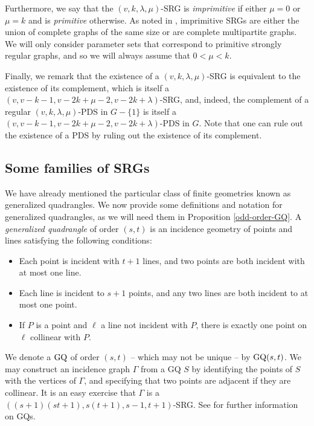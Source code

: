 \documentclass[12pt]{amsproc} %
\theoremstyle{definition}\newtheorem{defn}[thm]{Definition}
\theoremstyle{definition}\newtheorem{rem}[thm]{Remark}
\theoremstyle{definition}\newtheorem{ex}[thm]{Example}
\newcommand{\GQ}{{\rm GQ}}
\begin{document}
Furthermore, we say that the $(v, k, \lambda, \mu)$-SRG is \textit{imprimitive} if either $\mu = 0$ or $\mu = k$ and is \textit{primitive} otherwise. As noted in \cite[Section 1.1.3]{brouwer-maldeghem}, imprimitive SRGs are either the union of complete graphs of the same size or are complete multipartite graphs. We will only consider parameter sets that correspond to primitive strongly regular graphs, and so we will always assume that $0 < \mu < k$.

Finally, we remark that the existence of a $(v,k,\lambda, \mu)$-SRG is equivalent to the existence of its complement, which is itself a $(v, v - k - 1, v - 2k +\mu - 2, v - 2k + \lambda)$-SRG, and, indeed, the complement of a regular $(v, k, \lambda, \mu)$-PDS in $G - \{1\}$ is itself a $(v, v - k - 1, v - 2k +\mu - 2, v - 2k + \lambda)$-PDS in $G$. Note that one can rule out the existence of a PDS by ruling out the existence of its complement. 

\subsection{Some families of SRGs}
\label{subsec:famSRG}
We have already mentioned the particular class of finite geometries known as generalized quadrangles. We now provide some definitions and notation for generalized quadrangles, as we will need them in Proposition \ref{odd-order-GQ}. A \textit{generalized quadrangle} of order $(s, t)$ is an incidence geometry of points and lines satisfying the following conditions:
	\begin{itemize}
		\item[(i)] Each point is incident with $t+1$ lines, and two points are both incident with at most one line.
		\item[(ii)] Each line is incident to $s+1$ points, and any two lines are both incident to at most one point.
		\item[(iii)] If $P$ is a point and $\ell$ a line not incident with $P$, there is exactly one point on $\ell$ collinear with $P$.
	\end{itemize}
\noindent We denote a $\GQ$ of order $(s, t)$ -- which may not be unique -- by $\GQ(s, t)$. We may construct an incidence graph $\Gamma$ from a GQ $S$ by identifying the points of $S$ with the vertices of $\Gamma$, and specifying that two points are adjacent if they are collinear. It is an easy exercise that $\Gamma$ is a $((s+1)(st+1), s(t+1), s-1, t+1)$-SRG. See \cite[Section 2.2.9]{brouwer-maldeghem} for further information on GQs.
\end{document}
